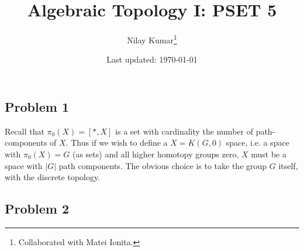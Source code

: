 \documentclass{../mathnotes}
\title{Algebraic Topology I: PSET 5}
\author{Nilay Kumar\footnote{Collaborated with Matei Ionita.}}
\date{Last updated: \today}
\begin{document}
\maketitle

\subsection*{Problem 1}
Recall that $\pi_0(X)=[*,X]$ is a set with cardinality the number of path-components of $X$.
Thus if we wish to define a $X=K(G,0)$ space, i.e. a space with $\pi_0(X)=G$ (as sets) and all
higher homotopy groups zero, $X$ must be a space with $|G|$ path components. The obvious
choice is to take the group $G$ itself, with the discrete topology.

\subsection*{Problem 2}
\end{document}
